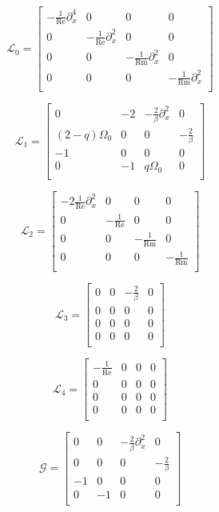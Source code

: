 \documentclass{emulateapj}
\newcommand{\beq}{\begin{equation}}
\newcommand{\eeq}{\end{equation}}
\newcommand\reye{\mathrm{Re}}
\newcommand\reym{\mathrm{Rm}}
\begin{document}
\beq
\mathcal{L}_0 = \left[\begin{matrix}
-\frac{1}{\reye}\partial_x^4 & 0 & 0 & 0 \\
0 & -\frac{1}{\reye}\partial_x^2 & 0 &0 \\
0 & 0 & -\frac{1}{\reym}\partial_x^2 & 0 \\
0 & 0 & 0 & -\frac{1}{\reym}\partial_x^2 \\ \end{matrix}\right]
\eeq

\beq
\mathcal{L}_1 = \left[\begin{matrix}
0 & -2 & -\frac{2}{\beta}\partial_x^2 & 0 \\
(2-q)\Omega_0 & 0 & 0 & -\frac{2}{\beta} \\
-1 & 0 & 0 & 0 \\
0 & -1 & q\Omega_0 & 0 \\ \end{matrix}\right] 
\eeq

\beq
\mathcal{L}_2 = \left[\begin{matrix}
-2\frac{1}{\reye} \partial_x^2 & 0 & 0 & 0 \\
0 & -\frac{1}{\reye} & 0 & 0 \\
0 & 0 & -\frac{1}{\reym} & 0 \\
0 & 0 & 0 & -\frac{1}{\reym} \\ \end{matrix}\right]
\eeq

\beq
\mathcal{L}_3 = \left[\begin{matrix}
0 & 0 & -\frac{2}{\beta} & 0 \\
0 & 0 & 0 & 0 \\
0 & 0 & 0 & 0 \\
0 & 0 & 0 & 0 \\ \end{matrix} \right]
\eeq

\beq
\mathcal{L}_4 = \left[\begin{matrix}
-\frac{1}{\reye} & 0 & 0 & 0 \\
0 & 0 & 0 & 0 \\
0 & 0 & 0 & 0 \\
0 & 0 & 0 & 0 \\ \end{matrix}\right] 
\eeq

\beq
\mathcal{G} = \left[\begin{matrix}
0 & 0 & -\frac{2}{\beta}\partial_x^2 & 0 \\
0 & 0 & 0 & -\frac{2}{\beta} \\
-1 & 0 & 0 & 0 \\
0 & -1 & 0 & 0 \\ \end{matrix} \right]
\eeq
\end{document}
